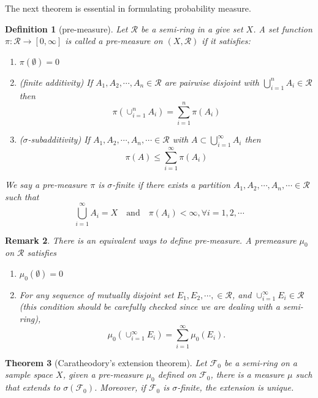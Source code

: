 \documentclass[11pt,english]{smfart}
\newtheorem{theorem}{Theorem}[subsection]
\newtheorem{definition}[theorem]{Definition}
\newtheorem{remark}[theorem]{Remark}
\newcommand{\mc}{\mathcal}
\begin{document}
The next theorem is essential in formulating probability measure. \\
\begin{definition}[pre-measure]
    Let $\mathcal{R}$ be a semi-ring in a give set $X$. A set function $\pi : \mc{R}\rightarrow [0,\infty]$ is called a pre-measure on $(X,\mc{R})$ if it satisfies: \begin{enumerate}
        \item $\pi(\emptyset) = 0$
        \item (finite additivity) If $A_1,A_2,\cdots,A_n \in \mc{R}$ are pairwise disjoint with $\bigcup_{i=1}^n A_i \in \mc{R}$ then $$\pi(\cup_{i=1}^n A_i)=\sum_{i=1}^n \pi(A_i)$$
        \item ($\sigma$-subadditivity) If $A_1,A_2,\cdots,A_n,\cdots \in \mc{R}$ with $A \subset \bigcup_{i=1}^\infty A_i$ then $$\pi(A) \leq \sum_{i=1}^\infty \pi(A_i)$$
    \end{enumerate}
    We say a pre-measure $\pi$ is $\sigma$-finite if there exists a partition $A_1,A_2,\cdots,A_n,\cdots \in \mc{R}$ such that $$\bigcup_{i=1}^\infty A_i = X \quad \text{and} \quad \pi(A_i) <\infty, \forall i =1,2,\cdots$$
\end{definition}

\begin{remark}
    There is an equivalent ways to define pre-measure. A premeasure $\mu_0$ on $\mc{R}$ satisfies \begin{enumerate}
        \item $\mu_0(\emptyset) = 0$
        \item For any sequence of mutually disjoint set $E_1,E_2,\cdots, \in \mc{R}$, and $\cup_{i=1}^\infty E_i \in \mc{R}$ (this condition should be carefully checked since we are dealing with a semi-ring), $$\mu_0\left(\cup_{i=1}^\infty E_i\right) = \sum_{i=1}^\infty \mu_0(E_i).$$
    \end{enumerate}
\end{remark}

\begin{theorem}[Caratheodory's extension theorem]
    Let $\mc{F}_0$ be a semi-ring on a sample space $X$, given a pre-measure $\mu_0$ defined on $\mc{F}_0$, there is a measure $\mu$ such that extends to $\sigma(\mc{F}_0)$. Moreover, if $\mc{F}_0$ is $\sigma$-finite, the extension is unique.\\
\end{theorem}
\end{document}
